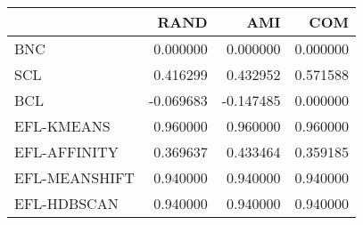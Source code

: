 \begin{tabular}{lrrr}
\toprule
 & RAND & AMI & COM \\
\midrule
BNC & 0.000000 & 0.000000 & 0.000000 \\
SCL & 0.416299 & 0.432952 & 0.571588 \\
BCL & -0.069683 & -0.147485 & 0.000000 \\
EFL-KMEANS & 0.960000 & 0.960000 & 0.960000 \\
EFL-AFFINITY & 0.369637 & 0.433464 & 0.359185 \\
EFL-MEANSHIFT & 0.940000 & 0.940000 & 0.940000 \\
EFL-HDBSCAN & 0.940000 & 0.940000 & 0.940000 \\
\bottomrule
\end{tabular}
